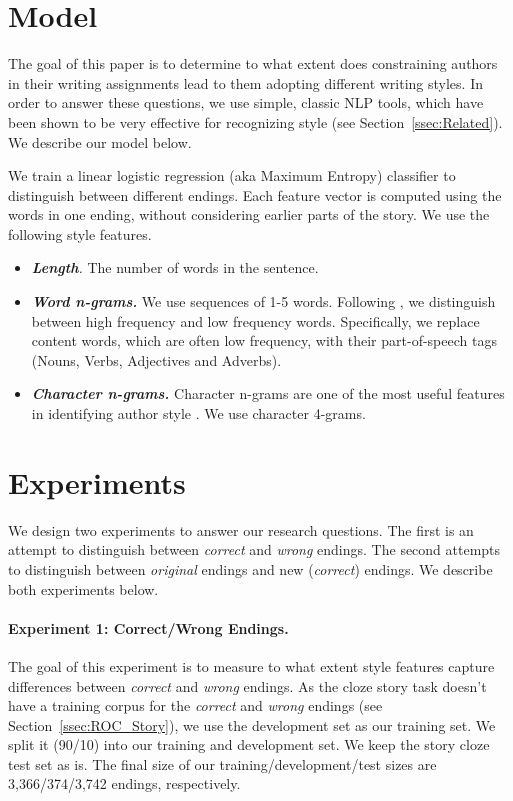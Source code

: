 \documentclass[11pt,a4paper]{article}
\newcommand{\secref}[1]{Section~\ref{ssec:#1}}
\newcommand{\isectionb}[1]{\section{#1}\label{ssec:#1}}
\begin{document}
\isectionb{Model}

The goal of this paper is to determine to what extent does constraining authors in their writing assignments lead to them adopting different writing styles. 
In order to answer these questions, we use simple, classic NLP tools, which have been shown to be very effective for recognizing style (see \secref{Related}).
We describe our model below.

We train a linear logistic regression (aka Maximum Entropy) classifier to distinguish between different endings. 
Each feature vector is computed using the words in one ending, without considering earlier parts of the story. 
We use the following style features.

\begin{itemize}
\item\textit{\textbf{Length}.} The number of words in the sentence.
\item\textit{\textbf{Word n-grams.}} We use sequences of 1-5 words. Following \cite{Tsur:2010,Schwartz:2013}, we distinguish between high frequency and low frequency words. 
Specifically, we replace content words, which are often low frequency, with their part-of-speech tags (Nouns, Verbs, Adjectives and Adverbs).
\item\textit{\textbf{Character n-grams.}} Character n-grams are one of the most useful features in identifying author style \cite{Stamatatos:2009}. 
We use character 4-grams.
\end{itemize}

\isectionb{Experiments}
We design two experiments to answer our research questions. 
The first is an attempt to distinguish between {\it correct} and {\it wrong} endings.
The second attempts to distinguish between {\it original} endings and new ({\it correct}) endings.
We describe both experiments below.

\paragraph{Experiment 1: Correct/Wrong Endings.}
The goal of this experiment is to measure to what extent  style features capture differences between {\it correct} and {\it wrong} endings.
As the cloze story task doesn't have a training corpus for the {\it correct} and {\it wrong} endings (see \secref{ROC_Story}), we use the development set as our training set. 
We split it (90/10) into our training and development set. We keep the story cloze test set as is.
The final size of our training/development/test sizes are 3,366/374/3,742 endings, respectively. 
\end{document}
